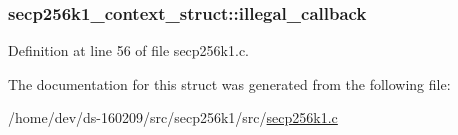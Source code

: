 \subsubsection[{illegal\+\_\+callback}]{ secp256k1\+\_\+context\+\_\+struct\+::illegal\+\_\+callback}\label{structsecp256k1__context__struct_a6f73572b18e62b306c5699e9e1470ab5}


Definition at line 56 of file secp256k1.\+c.



The documentation for this struct was generated from the following file\+:\begin{DoxyCompactItemize}
\item 
/home/dev/ds-\/160209/src/secp256k1/src/\hyperlink{secp256k1_8c}{secp256k1.\+c}\end{DoxyCompactItemize}
